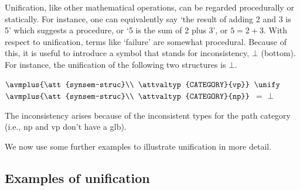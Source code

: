 \documentclass[12pt]{report}
\begin{document}
Unification, like other mathematical operations, can be
regarded procedurally or statically.  For instance, 
one can equivalently say `the result of adding 2 and 3 
is 5' which suggests a procedure, or `5 is the sum of 
2 plus 3', or $5=2+3$.   With respect to unification,
terms like `failure' are somewhat
procedural.
Because of this, it
is useful to introduce a 
symbol that stands for inconsistency, $\bot$ 
(bottom).
For instance, the unification of the following two structures is
$\bot$.
\begin{ex}
{\tiny $\avmplus{\att{synsem-struc}\\
\attvaltyp{CATEGORY}{vp}}$} $\unify$
{\tiny $\avmplus{\att{synsem-struc}\\
\attvaltyp{CATEGORY}{np}}$}
$=$
$\bot$
\end{ex}
The inconsistency arises because of the inconsistent types for the
path {\feature category} (i.e., {\type np} and {\type vp} don't have a glb).

We now use some further examples to illustrate unification in more
detail.  

\subsection{Examples of unification}
\end{document}
